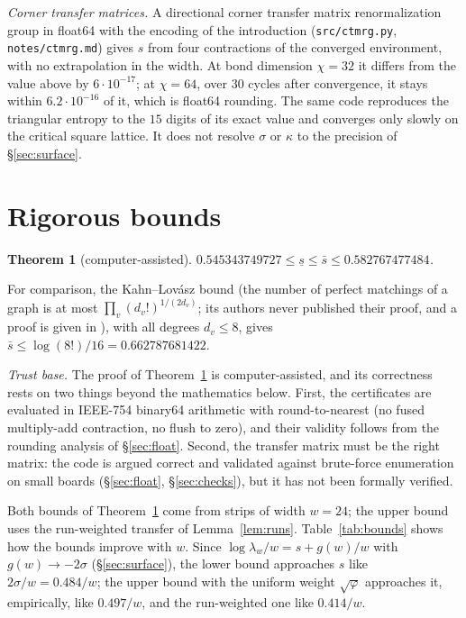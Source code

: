 \documentclass[11pt]{amsart}
\newtheorem{theorem}{Theorem}[section]
\theoremstyle{definition}
\theoremstyle{remark}
\newcommand{\file}[1]{\texttt{#1}}
\begin{document}
\emph{Corner transfer matrices.} A directional corner transfer matrix renormalization group in
float64 with the encoding of the introduction (\file{src/ctmrg.py}, \file{notes/ctmrg.md}) gives $s$
from four contractions of the converged environment, with no extrapolation in the width. At bond
dimension $\chi = 32$ it differs from the value above by $6\cdot10^{-17}$; at $\chi = 64$, over $30$
cycles after convergence, it stays within $6.2\cdot10^{-16}$ of it, which is float64 rounding.
The same code reproduces the triangular entropy to the $15$ digits of its exact value and converges
only slowly on the critical square lattice. It does not resolve $\sigma$ or $\kappa$ to the precision
of \S\ref{sec:surface}.

\section{Rigorous bounds}\label{sec:bounds}

\begin{theorem}[computer-assisted]\label{thm:bounds}
$0.545343749727 \le \underline s \le \bar s \le 0.582767477484$.
\end{theorem}

For comparison, the Kahn--Lov\'asz bound (the number of perfect matchings of a graph is at most
$\prod_v (d_v!)^{1/(2 d_v)}$; its authors never published their proof, and a proof is given in
\cite{alonfriedland2008}), with all degrees $d_v \le 8$, gives
$\bar s \le \log(8!)/16 = 0.662787681422$.

\emph{Trust base.} The proof of Theorem~\ref{thm:bounds} is computer-assisted, and its correctness
rests on two things beyond the mathematics below. First, the certificates are evaluated in
IEEE-754 binary64 arithmetic with round-to-nearest (no fused multiply-add contraction, no flush to
zero), and their validity follows from the rounding analysis of \S\ref{sec:float}. Second, the
transfer matrix must be the right matrix: the code is argued correct and validated against
brute-force enumeration on small boards (\S\ref{sec:float}, \S\ref{sec:checks}), but it has not been
formally verified.

Both bounds of Theorem~\ref{thm:bounds} come from strips of width $w = 24$; the upper bound uses
the run-weighted transfer of Lemma~\ref{lem:runs}. Table~\ref{tab:bounds} shows how the bounds
improve with $w$. Since $\log \lambda_w / w = s + g(w)/w$ with $g(w) \to -2\sigma$
(\S\ref{sec:surface}), the lower bound approaches $s$ like $2\sigma/w = 0.484/w$; the upper bound
with the uniform weight $\sqrt\varphi$ approaches it, empirically, like $0.497/w$, and the
run-weighted one like $0.414/w$.
\end{document}
